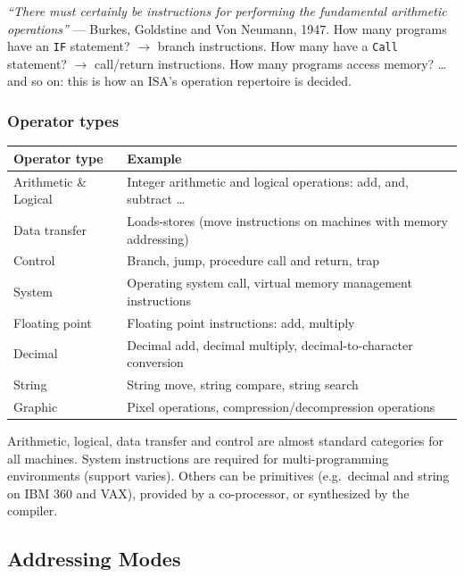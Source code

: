 \begin{explanation}
\emph{``There must certainly be instructions for performing the fundamental
arithmetic operations''} --- Burkes, Goldstine and Von Neumann, 1947.
How many programs have an \texttt{IF} statement? $\to$ branch instructions.
How many have a \texttt{Call} statement? $\to$ call/return instructions. How
many programs access memory? \dots and so on: this is how an ISA's operation
repertoire is decided.
\end{explanation}

\subsubsection{Operator types}

\begin{center}
\begin{tabular}{@{}p{3.2cm}p{10.5cm}@{}}
\toprule
Operator type & Example \\
\midrule
Arithmetic \& Logical & Integer arithmetic and logical operations: add, and,
subtract \dots \\
Data transfer & Loads-stores (move instructions on machines with memory
addressing) \\
Control & Branch, jump, procedure call and return, trap \\
System & Operating system call, virtual memory management instructions \\
Floating point & Floating point instructions: add, multiply \\
Decimal & Decimal add, decimal multiply, decimal-to-character conversion \\
String & String move, string compare, string search \\
Graphic & Pixel operations, compression/decompression operations \\
\bottomrule
\end{tabular}
\end{center}

\begin{remark}
Arithmetic, logical, data transfer and control are almost standard
categories for all machines. System instructions are required for
multi-programming environments (support varies). Others can be primitives
(e.g.\ decimal and string on IBM 360 and VAX), provided by a co-processor,
or synthesized by the compiler.
\end{remark}

\subsection{Addressing Modes}
\label{sec:addressing-modes}

